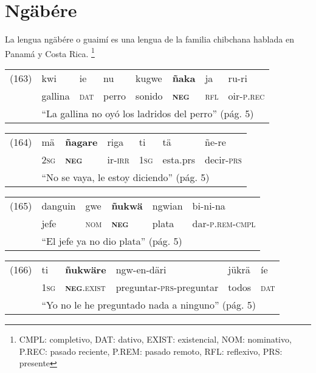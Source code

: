 \section*{Ngäbére}

\noindent La lengua ngäbére o guaimí es una lengua de la familia chibchana hablada en Panamá y Costa Rica.
\footnote{CMPL: completivo, DAT: dativo, EXIST: existencial, NOM: nominativo, P.REC: pasado reciente, P.REM: pasado remoto, RFL: reflexivo, PRS: presente}
\vspace{0.5cm}

{\setmainfont{Charis SIL} 

\begin{tabular}{llllllll}
(163) & kwi & ie & nu & kugwe & \textbf{ñaka} & ja & ru-ri \\
& gallina & \textsc{dat} & perro & sonido & \textsc{\textbf{neg}} & \textsc{rfl} & oir-\textsc{p.rec} \\
& \multicolumn{7}{l}{``La gallina no oyó los ladridos del perro'' (pág. 5)}
\end{tabular} \vspace{0.5cm}

\begin{tabular}{lllllll}
(164) & mä & \textbf{ñagare} & riga & ti & tä & ñe-re \\
& \textsc{2sg} & \textsc{\textbf{neg}} & ir-\textsc{irr} & \textsc{1sg} & esta.prs & decir-\textsc{prs} \\
& \multicolumn{6}{l}{``No se vaya, le estoy diciendo'' (pág. 5)}
\end{tabular} \vspace{0.5cm}

\begin{tabular}{llllll}
(165) & danguin & gwe & \textbf{ñukwä} & ngwian & bi-ni-na \\
& jefe & \textsc{nom} & \textsc{\textbf{neg}} & plata & dar-\textsc{p.rem-cmpl} \\
& \multicolumn{5}{l}{``El jefe ya no dio plata'' (pág. 5)}
\end{tabular} \vspace{0.5cm}

\begin{tabular}{llllll}
(166) & ti & \textbf{ñukwäre} & ngw-en-däri & jükrä & íe \\
& \textsc{1sg} & \textsc{\textbf{neg}.exist} & preguntar-\textsc{prs-}preguntar & todos & \textsc{dat} \\
& \multicolumn{5}{l}{``Yo no le he preguntado nada a ninguno'' (pág. 5)}
\end{tabular} \vspace{0.5cm}

}
